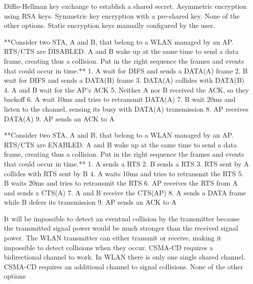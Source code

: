 \begin{questions}
    \begin{checkboxes}
        \CorrectChoice Diffie-Hellman key exchange to establish a shared secret.
        \choice Asymmetric encryption using RSA keys.
        \choice Symmetric key encryption with a pre-shared key.
        \choice None of the other options.
        \choice Static encryption keys manually configured by the user.
    \end{checkboxes}

    **Consider two STA, A and B, that belong to a WLAN managed by an AP. RTS/CTS are DISABLED.
    A and B wake up at the same time to send a data frame, creating thus a collision.
    Put in the right sequence the frames and events that could occur in time.**
    1. A wait for DIFS and sends a DATA(A) frame
    2. B wait for DIFS and sends a DATA(B) frame
    3. DATA(A) collides with DATA(B)
    4. A and B wait for the AP's ACK
    5. Neither A nor B received the ACK, so they backoff
    6. A wait 10ms and tries to retransmit DATA(A)
    7. B wait 20ms and listen to the channel, sensing its busy with DATA(A) transmission
    8. AP receives DATA(A)
    9. AP sends an ACK to A

    **Consider two STA, A and B, that belong to a WLAN managed by an AP. RTS/CTS are ENABLED.
    A and B wake up at the same time to send a data frame, creating thus a collision.
    Put in the right sequence the frames and events that could occur in time.**
    1. A sends a RTS
    2. B sends a RTS
    3. RTS sent by A collides with RTS sent by B
    4. A waits 10ms and tries to retransmit the RTS
    5. B waits 20ms and tries to retransmit the RTS
    6. AP receives the RTS from A and sends a CTS(A)
    7. A and B receive the CTS(AP)
    8. A sends a DATA frame while B defers its transmission
    9. AP sends an ACK to A

    \begin{checkboxes}
        \CorrectChoice It will be impossible to detect an eventual collision by the transmitter because the transmitted signal power would be much stronger than the received signal power.
        \CorrectChoice The WLAN transmitter can either transmit or receive, making it impossible to detect collisions when they occur.
        \choice CSMA-CD requires a bidirectional channel to work. In WLAN there is only one single shared channel.
        \choice CSMA-CD requires an additional channel to signal collisions.
        \choice None of the other options
    \end{checkboxes}


\end{questions}
